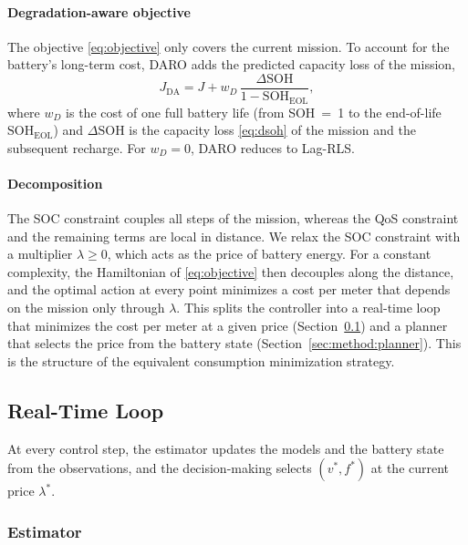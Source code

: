 \paragraph{Degradation-aware objective}
The objective \eqref{eq:objective} only covers the current mission. To account for the
battery's long-term cost, DARO adds the predicted capacity loss of the mission,
\begin{equation}
  J_{\mathrm{DA}} = J + w_D \,\frac{\Delta\mathrm{SOH}}{1 - \mathrm{SOH}_{\mathrm{EOL}}},
  \label{eq:da}
\end{equation}
where $w_D$ is the cost of one full battery life (from \ac{SOH}~=~1 to the end-of-life
$\mathrm{SOH}_{\mathrm{EOL}}$) and $\Delta\mathrm{SOH}$ is the capacity loss \eqref{eq:dsoh} of the
mission and the subsequent recharge. For $w_D = 0$, DARO reduces to Lag-RLS.

\paragraph{Decomposition}
The \ac{SOC} constraint couples all steps of the mission, whereas the \ac{QoS} constraint and the
remaining terms are local in distance. We relax the \ac{SOC} constraint with a multiplier
$\lambda \geq 0$, which acts as the price of battery energy. For a constant complexity, the
Hamiltonian of \eqref{eq:objective} then decouples along the distance, and the optimal action at every
point minimizes a cost per meter that depends on the mission only through $\lambda$. This
splits the controller into a real-time loop that minimizes the cost per meter at a given price
(Section~\ref{sec:method:rt}) and a planner that selects the price from the battery state
(Section~\ref{sec:method:planner}). This is the structure of the equivalent consumption
minimization strategy.

\subsection{Real-Time Loop}
\label{sec:method:rt}

At every control step, the estimator updates the models and the battery state from the
observations, and the decision-making selects $(v^\ast, f^\ast)$ at the current price $\lambda^\ast$.

\subsubsection{Estimator}
\label{sec:method:estimation}

